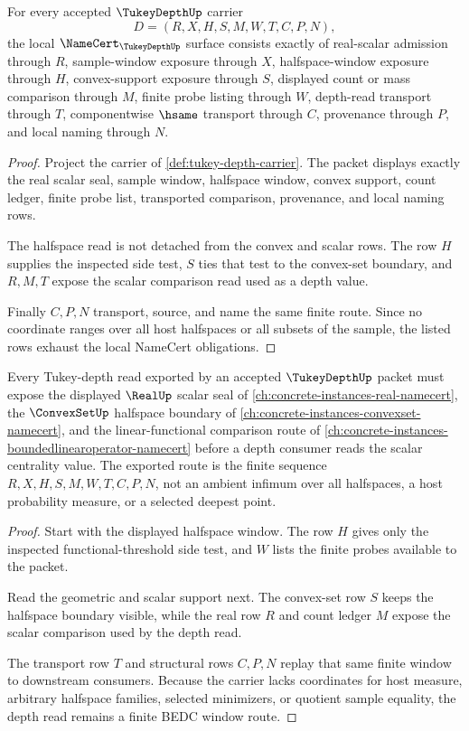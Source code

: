 \begin{theorem}
\label{thm:tukey-depth-namecert-obligations}
For every accepted $\TukeyDepthUp$ carrier
$$
D=(R,X,H,S,M,W,T,C,P,N),
$$
the local $\NameCert_{\TukeyDepthUp}$ surface consists exactly of real-scalar admission through $R$, sample-window exposure through $X$, halfspace-window exposure through $H$, convex-support exposure through $S$, displayed count or mass comparison through $M$, finite probe listing through $W$, depth-read transport through $T$, componentwise $\hsame$ transport through $C$, provenance through $P$, and local naming through $N$.
\end{theorem}
\begin{proof}
Project the carrier of \autoref{def:tukey-depth-carrier}. The packet displays exactly the real scalar seal, sample window, halfspace window, convex support, count ledger, finite probe list, transported comparison, provenance, and local naming rows.

The halfspace read is not detached from the convex and scalar rows. The row $H$ supplies the inspected side test, $S$ ties that test to the convex-set boundary, and $R,M,T$ expose the scalar comparison read used as a depth value.

Finally $C,P,N$ transport, source, and name the same finite route. Since no coordinate ranges over all host halfspaces or all subsets of the sample, the listed rows exhaust the local NameCert obligations.
\end{proof}

\begin{theorem}
\label{thm:tukey-depth-halfspace-window-route}
Every Tukey-depth read exported by an accepted $\TukeyDepthUp$ packet must expose the displayed $\RealUp$ scalar seal of \autoref{ch:concrete-instances-real-namecert}, the $\ConvexSetUp$ halfspace boundary of \autoref{ch:concrete-instances-convexset-namecert}, and the linear-functional comparison route of \autoref{ch:concrete-instances-boundedlinearoperator-namecert} before a depth consumer reads the scalar centrality value. The exported route is the finite sequence $R,X,H,S,M,W,T,C,P,N$, not an ambient infimum over all halfspaces, a host probability measure, or a selected deepest point.
\end{theorem}
\begin{proof}
Start with the displayed halfspace window. The row $H$ gives only the inspected functional-threshold side test, and $W$ lists the finite probes available to the packet.

Read the geometric and scalar support next. The convex-set row $S$ keeps the halfspace boundary visible, while the real row $R$ and count ledger $M$ expose the scalar comparison used by the depth read.

The transport row $T$ and structural rows $C,P,N$ replay that same finite window to downstream consumers. Because the carrier lacks coordinates for host measure, arbitrary halfspace families, selected minimizers, or quotient sample equality, the depth read remains a finite BEDC window route.
\end{proof}

